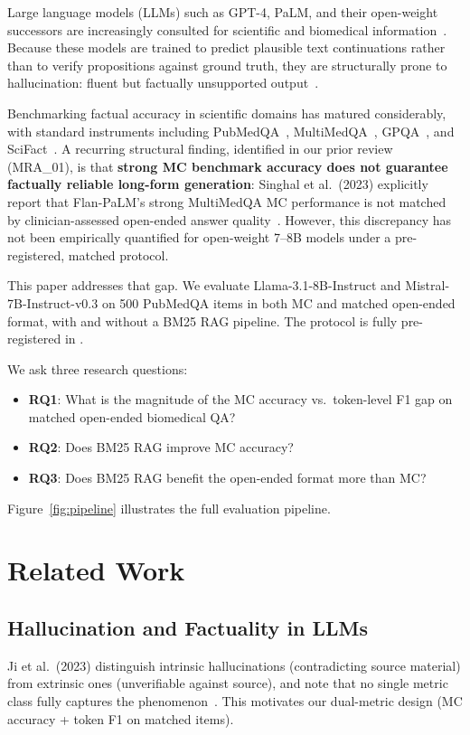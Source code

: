 \documentclass[sigconf, nonacm]{acmart}
\begin{document}
Large language models (LLMs) such as GPT-4, PaLM, and their open-weight successors
are increasingly consulted for scientific and biomedical information~\cite{Singhal2023}.
Because these models are trained to predict plausible text continuations rather than
to verify propositions against ground truth, they are structurally prone to hallucination:
fluent but factually unsupported output~\cite{Ji2023}.

Benchmarking factual accuracy in scientific domains has matured considerably,
with standard instruments including PubMedQA~\cite{Jin2019},
MultiMedQA~\cite{Singhal2023}, GPQA~\cite{Rein2023}, and SciFact~\cite{Wadden2020}.
A recurring structural finding, identified in our prior review (MRA\_01), is that
\textbf{strong MC benchmark accuracy does not guarantee factually reliable long-form
generation}: Singhal et al.\ (2023) explicitly report that Flan-PaLM's strong
MultiMedQA MC performance is not matched by clinician-assessed open-ended answer
quality~\cite{Singhal2023}. However, this discrepancy has not been empirically
quantified for open-weight 7--8B models under a pre-registered, matched protocol.

This paper addresses that gap. We evaluate Llama-3.1-8B-Instruct and
Mistral-7B-Instruct-v0.3 on 500 PubMedQA items in both MC and matched
open-ended format, with and without a BM25 RAG pipeline. The protocol is fully
pre-registered in .

We ask three research questions:
\begin{itemize}
  \item \textbf{RQ1}: What is the magnitude of the MC accuracy vs.\ token-level F1
        gap on matched open-ended biomedical QA?
  \item \textbf{RQ2}: Does BM25 RAG improve MC accuracy?
  \item \textbf{RQ3}: Does BM25 RAG benefit the open-ended format more than MC?
\end{itemize}

Figure~\ref{fig:pipeline} illustrates the full evaluation pipeline.

\section{Related Work}

\subsection{Hallucination and Factuality in LLMs}
Ji et al.\ (2023) distinguish intrinsic hallucinations (contradicting source material)
from extrinsic ones (unverifiable against source), and note that no single metric
class fully captures the phenomenon~\cite{Ji2023}. This motivates our dual-metric
design (MC accuracy + token F1 on matched items).
\end{document}

